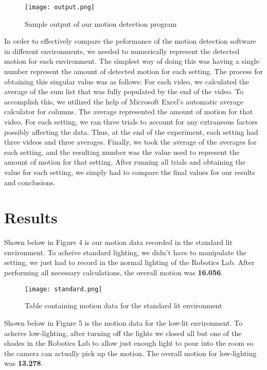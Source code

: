 \documentclass[sigsmall]{acmart}
\begin{document}
\begin{figure}[h!]
	\texttt{[image: output.png]}
	\caption{Sample output of our motion detection program}
	\label{fig:output}
\end{figure}

In order to effectively compare the peformance of the motion detection software in different environments, we needed to numerically represent the detected motion for each environment.  The simplest way of doing this was having a single number represent the amount of detected motion for each setting.  The process for obtaining this singular value was as follows: For each video, we calculated the average of the sum list that was fully populated by the end of the video.  To accomplish this, we utilized the help of Microsoft Excel's automatic average calculator for columns.  The average represented the amount of motion for that video.  For each setting, we ran three trials to account for any extraneous factors possibly affecting the data.  Thus, at the end of the experiment, each setting had three videos and three averages.  Finally, we took the average of the averages for each setting, and the resulting number was the value used to represent the amount of motion for that setting.  After running all trials and obtaining the value for each setting, we simply had to compare the final values for our results and conclusions.

\section*{Results}
Shown below in Figure 4 is our motion data recorded in the standard lit environment.  To acheive standard lighting, we didn't have to manipulate the setting, we just had to record in the normal lighting of the Robotics Lab. After performing all necessary calculations, the overall motion was \textbf{16.056}.

\begin{figure}[h!]
	\texttt{[image: standard.png]}
	\caption{Table containing motion data for the standard lit environment}
	\label{fig:standard}
\end{figure}

Shown below in Figure 5 is the motion data for the low-lit environment.  To acheive low-lighting, after turning off the lights we closed all but one of the shades in the Robotics Lab to allow just enough light to pour into the room so the camera can actually pick up the motion.  The overall motion for low-lighting was \textbf{13.278}.
\end{document}
